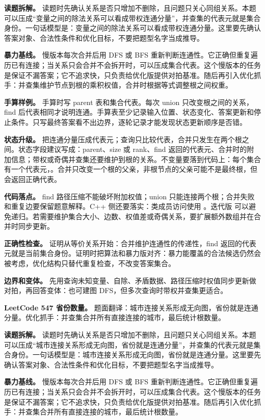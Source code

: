 \textbf{读题拆解。} 读题时先确认关系是否只增加不删除，且问题只关心同组关系。本题可以压成“变量之间的除法关系可以看成带权连通分量”，并查集的代表元就是集合身份。一句话模型是：变量之间的除法关系可以看成带权连通分量。这里要先确认答案对象、合法性条件和优化目标，不要把题型名字当成推导。

\textbf{暴力基线。} 慢版本每次合并后用 DFS 或 BFS 重新判断连通性。它正确但重复遍历已有连接；当关系只会合并不会拆开时，可以压成集合代表。这个慢版本的任务是保证不漏答案；它不追求快，只负责给优化版提供对拍基准。随后再引入优化抓手：并查集维护节点到根的乘积权值，合并时根据等式调整根之间权重。

\textbf{手算样例。} 手算时写 parent 表和集合代表。每次 union 只改变根之间的关系，find 后代表相同才说明连通。手算表至少记录输入位置、状态变化、答案更新和停止条件。只写最终答案看不出边界，逐轮记录才能发现状态更新顺序是否错。

\textbf{状态升级。} 把连通分量压成代表元；查询只比较代表，合并只发生在两个根之间。状态字段建议写成：parent、size 或 rank、find 返回的代表元、合并时的附加信息；带权或奇偶并查集还要维护到根的关系。不变量要落到代码上：每个集合有一个代表元，。合并只改变一个根的父亲，非根节点的父亲可能不是最终根，但  会返回正确代表。

\textbf{代码落点。} find 路径压缩不能破坏附加权值；union 只能连接两个根；合并失败和重复边要保留题意解释。C++ 侧还要落实：类成员访问使用 。迭代版  可以避免递归。若需要维护集合大小、边数、权值差或奇偶关系，要扩展额外数组并在合并时同步更新。

\textbf{正确性检查。} 证明从等价关系开始：合并维护连通性的传递性，find 返回的代表元就是当前集合身份。证明时把算法和暴力版对齐：暴力能覆盖的合法候选仍然会被考虑，优化结构只替代重复检查，不改变答案集合。

\textbf{边界和变体。} 先用查询未知变量、自除、矛盾数据、路径压缩时权值同步更新做对拍，再回答变体：也可建图 DFS，但多次查询时带权并查集更适合。

\noindent\textbf{LeetCode 547 省份数量。} 题面翻译：城市连接关系形成无向图，省份就是连通分量。优化抓手：并查集合并所有直接连接的城市，最后统计根数量。

\textbf{读题拆解。} 读题时先确认关系是否只增加不删除，且问题只关心同组关系。本题可以压成“城市连接关系形成无向图，省份就是连通分量”，并查集的代表元就是集合身份。一句话模型是：城市连接关系形成无向图，省份就是连通分量。这里要先确认答案对象、合法性条件和优化目标，不要把题型名字当成推导。

\textbf{暴力基线。} 慢版本每次合并后用 DFS 或 BFS 重新判断连通性。它正确但重复遍历已有连接；当关系只会合并不会拆开时，可以压成集合代表。这个慢版本的任务是保证不漏答案；它不追求快，只负责给优化版提供对拍基准。随后再引入优化抓手：并查集合并所有直接连接的城市，最后统计根数量。

